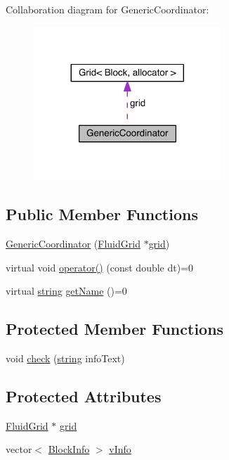 Collaboration diagram for Generic\+Coordinator\+:\nopagebreak
\begin{figure}[H]
\begin{center}
\leavevmode
\includegraphics[width=200pt]{d2/da7/class_generic_coordinator__coll__graph}
\end{center}
\end{figure}
\subsection*{Public Member Functions}
\begin{DoxyCompactItemize}
\item 
\hyperlink{class_generic_coordinator_a3e68db057c2da9e7f6fc9e73f7491be0}{Generic\+Coordinator} (\hyperlink{_definitions_8h_aff3288a3741f5098bcc456bb13440189}{Fluid\+Grid} $\ast$\hyperlink{class_generic_coordinator_aa514bbf7394bb5519c6f12daa33a375a}{grid})
\item 
virtual void \hyperlink{class_generic_coordinator_a984696fef63daf7253b87ce21cce3f94}{operator()} (const double dt)=0
\item 
virtual \hyperlink{testfpzip_8cpp_a984bb8e04129c4268bd6ff36a50c9fa4}{string} \hyperlink{class_generic_coordinator_a8c1b9f4fa96d1c7b851e85e19325de1d}{get\+Name} ()=0
\end{DoxyCompactItemize}
\subsection*{Protected Member Functions}
\begin{DoxyCompactItemize}
\item 
void \hyperlink{class_generic_coordinator_a3391a6091f1d5115af4b92656c39cd85}{check} (\hyperlink{testfpzip_8cpp_a984bb8e04129c4268bd6ff36a50c9fa4}{string} info\+Text)
\end{DoxyCompactItemize}
\subsection*{Protected Attributes}
\begin{DoxyCompactItemize}
\item 
\hyperlink{_definitions_8h_aff3288a3741f5098bcc456bb13440189}{Fluid\+Grid} $\ast$ \hyperlink{class_generic_coordinator_aa514bbf7394bb5519c6f12daa33a375a}{grid}
\item 
vector$<$ \hyperlink{struct_block_info}{Block\+Info} $>$ \hyperlink{class_generic_coordinator_a48c2df68fe1011811521210699122867}{v\+Info}
\end{DoxyCompactItemize}


